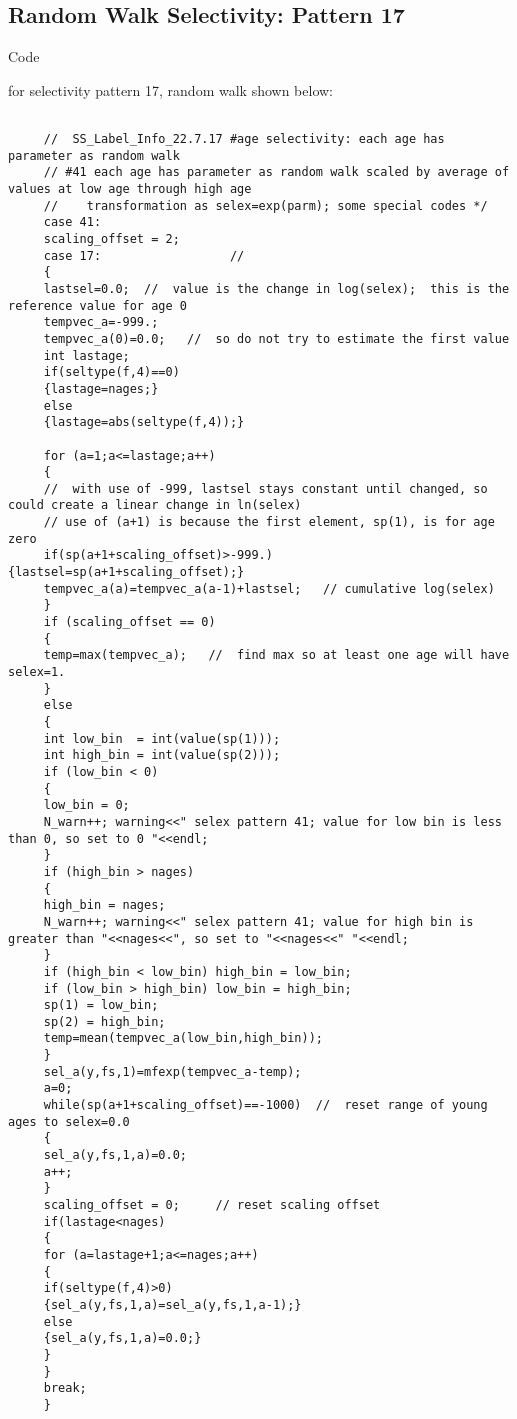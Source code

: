 \subsection{Random Walk Selectivity: Pattern 17}
\hypertarget{RandWalkSelex}{Code} for selectivity pattern 17, random walk shown below:
\scriptsize{
	\begin{verbatim}
	 
	 //  SS_Label_Info_22.7.17 #age selectivity: each age has parameter as random walk
	 // #41 each age has parameter as random walk scaled by average of values at low age through high age
	 //    transformation as selex=exp(parm); some special codes */
	 case 41:
	 scaling_offset = 2;
	 case 17:                  //
	 {
	 lastsel=0.0;  //  value is the change in log(selex);  this is the reference value for age 0
	 tempvec_a=-999.;
	 tempvec_a(0)=0.0;   //  so do not try to estimate the first value
	 int lastage;
	 if(seltype(f,4)==0)
	 {lastage=nages;}
	 else
	 {lastage=abs(seltype(f,4));}
	 
	 for (a=1;a<=lastage;a++)
	 {
	 //  with use of -999, lastsel stays constant until changed, so could create a linear change in ln(selex)
	 // use of (a+1) is because the first element, sp(1), is for age zero
	 if(sp(a+1+scaling_offset)>-999.) {lastsel=sp(a+1+scaling_offset);}
	 tempvec_a(a)=tempvec_a(a-1)+lastsel;   // cumulative log(selex)
	 }
	 if (scaling_offset == 0)
	 {
	 temp=max(tempvec_a);   //  find max so at least one age will have selex=1.
	 }
	 else
	 {
	 int low_bin  = int(value(sp(1)));
	 int high_bin = int(value(sp(2)));
	 if (low_bin < 0)
	 {
	 low_bin = 0;
	 N_warn++; warning<<" selex pattern 41; value for low bin is less than 0, so set to 0 "<<endl;
	 }
	 if (high_bin > nages)
	 {
	 high_bin = nages;
	 N_warn++; warning<<" selex pattern 41; value for high bin is greater than "<<nages<<", so set to "<<nages<<" "<<endl;
	 }
	 if (high_bin < low_bin) high_bin = low_bin;
	 if (low_bin > high_bin) low_bin = high_bin;
	 sp(1) = low_bin;
	 sp(2) = high_bin;
	 temp=mean(tempvec_a(low_bin,high_bin));
	 }
	 sel_a(y,fs,1)=mfexp(tempvec_a-temp);
	 a=0;
	 while(sp(a+1+scaling_offset)==-1000)  //  reset range of young ages to selex=0.0
	 {
	 sel_a(y,fs,1,a)=0.0;
	 a++;
	 }
	 scaling_offset = 0;     // reset scaling offset
	 if(lastage<nages)
	 {
	 for (a=lastage+1;a<=nages;a++)
	 {
	 if(seltype(f,4)>0)
	 {sel_a(y,fs,1,a)=sel_a(y,fs,1,a-1);}
	 else
	 {sel_a(y,fs,1,a)=0.0;}
	 }
	 }
	 break;
	 }  
	\end{verbatim}

}
